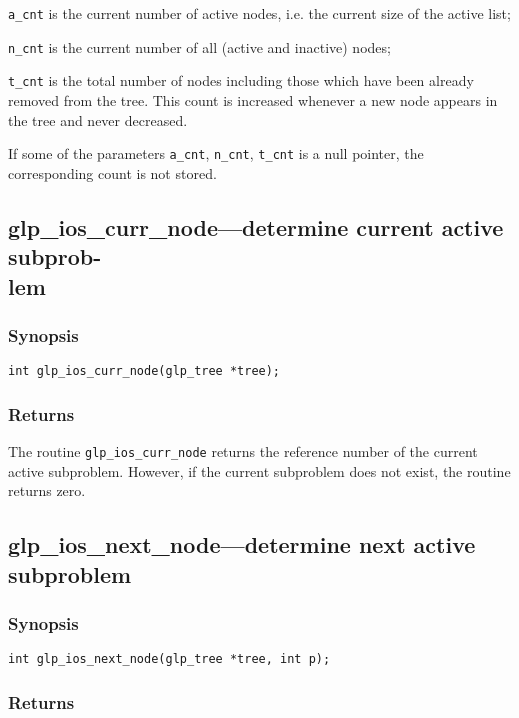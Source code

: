 \verb|a_cnt| is the current number of active nodes, i.e. the current
size of the active list;

\verb|n_cnt| is the current number of all (active and inactive) nodes;

\verb|t_cnt| is the total number of nodes including those which have
been already removed from the tree. This count is increased whenever
a new node appears in the tree and never decreased.

If some of the parameters \verb|a_cnt|, \verb|n_cnt|, \verb|t_cnt| is
a null pointer, the corresponding count is not stored.

\subsection{glp\_ios\_curr\_node---determine current active subprob-\\
lem}

\subsubsection*{Synopsis}

\begin{verbatim}
int glp_ios_curr_node(glp_tree *tree);
\end{verbatim}

\subsubsection*{Returns}

The routine \verb|glp_ios_curr_node| returns the reference number of the
current active subproblem. However, if the current subproblem does not
exist, the routine returns zero.

\newpage

\subsection{glp\_ios\_next\_node---determine next active subproblem}

\subsubsection*{Synopsis}

\begin{verbatim}
int glp_ios_next_node(glp_tree *tree, int p);
\end{verbatim}

\subsubsection*{Returns}


